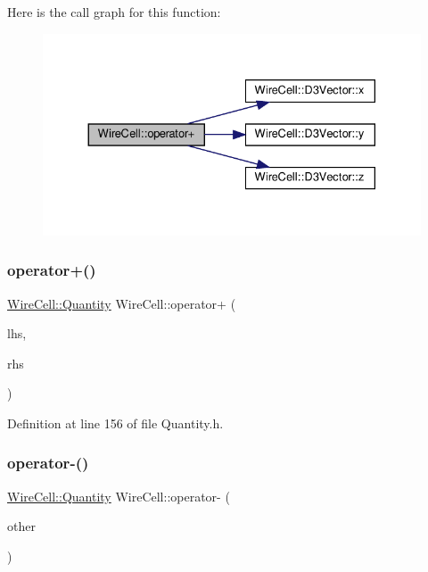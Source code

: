 Here is the call graph for this function\+:
\nopagebreak
\begin{figure}[H]
\begin{center}
\leavevmode
\includegraphics[width=330pt]{namespace_wire_cell_a75ea0ed7ca0e2da14f517e19859dffce_cgraph}
\end{center}
\end{figure}
\mbox{\label{namespace_wire_cell_a371b6395c9b33a3471d9c754ef24981e}} 
\subsubsection{\texorpdfstring{operator+()}{operator+()}\hspace{0.1cm}{\footnotesize\ttfamily [2/2]}}
{\footnotesize\ttfamily \hyperlink{class_wire_cell_1_1_quantity}{Wire\+Cell\+::\+Quantity} Wire\+Cell\+::operator+ (\begin{DoxyParamCaption}\item[{const \hyperlink{class_wire_cell_1_1_quantity}{Wire\+Cell\+::\+Quantity} \&}]{lhs,  }\item[{const \hyperlink{class_wire_cell_1_1_quantity}{Wire\+Cell\+::\+Quantity} \&}]{rhs }\end{DoxyParamCaption})\hspace{0.3cm}{\ttfamily [inline]}}



Definition at line 156 of file Quantity.\+h.

\mbox{\label{namespace_wire_cell_ad9e6366de8387b1bac5e86f5934ab7ba}} 
\subsubsection{\texorpdfstring{operator-\/()}{operator-()}\hspace{0.1cm}{\footnotesize\ttfamily [1/3]}}
{\footnotesize\ttfamily \hyperlink{class_wire_cell_1_1_quantity}{Wire\+Cell\+::\+Quantity} Wire\+Cell\+::operator-\/ (\begin{DoxyParamCaption}\item[{const \hyperlink{class_wire_cell_1_1_quantity}{Wire\+Cell\+::\+Quantity} \&}]{other }\end{DoxyParamCaption})\hspace{0.3cm}{\ttfamily [inline]}}



